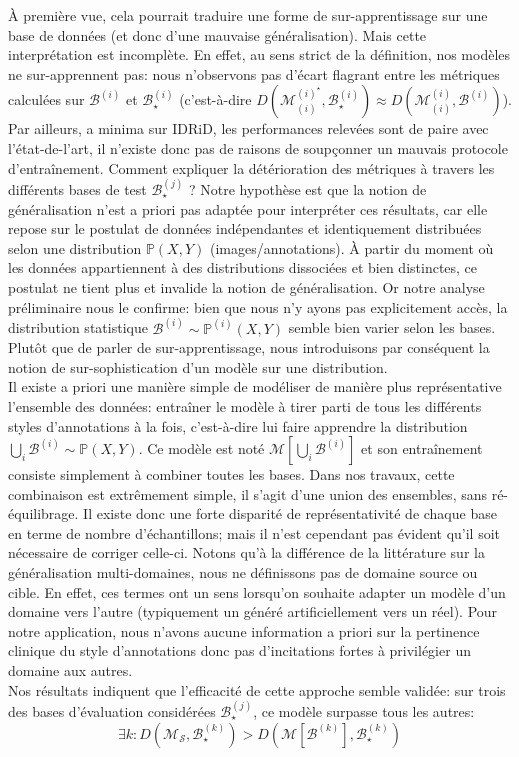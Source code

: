 À première vue, cela pourrait traduire une forme de sur-apprentissage sur une base de données (et donc d'une mauvaise généralisation). Mais cette interprétation est incomplète. En effet, au sens strict de la définition, nos modèles ne sur-apprennent pas: nous n'observons pas d'écart flagrant entre les métriques calculées sur $\mathcal{B}^{(i)}$ et $\mathcal{B}^{(i)}_{\star}$ (c'est-à-dire $D(\mathcal{M}_{(i)}^{(i)^\star},\mathcal{B}^{(i)}_{\star}) \approx D(\mathcal{M}_{(i)}^{(i)}, \mathcal{B}^{(i)})$). Par ailleurs, a minima sur IDRiD, les performances relevées sont de paire avec l'état-de-l'art, il n'existe donc pas de raisons de soupçonner un mauvais protocole d'entraînement. Comment expliquer la détérioration des métriques à travers les différents bases de test $\mathcal{B}^{(j)}_{\star}$ ? Notre hypothèse est que la notion de généralisation n'est a priori pas adaptée pour interpréter ces résultats, car elle repose sur le postulat de données indépendantes et identiquement distribuées selon une distribution $\mathbb{P}(X, Y)$ (images/annotations). À partir du moment où les données appartiennent à des distributions dissociées et bien distinctes, ce postulat ne tient plus et invalide la notion de généralisation. Or notre analyse préliminaire nous le confirme: bien que nous n'y ayons pas explicitement accès, la distribution statistique $\mathcal{B}^{(i)} \sim \mathbb{P}^{(i)}(X, Y)$ semble bien varier selon les bases. Plutôt que de parler de sur-apprentissage, nous introduisons par conséquent la notion de sur-sophistication d'un modèle sur une distribution. 
\\
Il existe a priori une manière simple de modéliser de manière plus représentative l'ensemble des données: entraîner le modèle à tirer parti de tous les différents styles d'annotations à la fois, c'est-à-dire lui faire apprendre la distribution $\bigcup_i \mathcal{B}^{(i)} \sim \mathbb{P}(X, Y)$. Ce modèle est noté $\mathcal{M}[\bigcup_i \mathcal{B}^{(i)}]$ et son entraînement consiste simplement à combiner toutes les bases. Dans nos travaux, cette combinaison est extrêmement simple, il s'agit d'une union des ensembles, sans ré-équilibrage. Il existe donc une forte disparité de représentativité de chaque base en terme de nombre d'échantillons; mais il n'est cependant pas évident qu'il soit nécessaire de corriger celle-ci. Notons qu'à la différence de la littérature sur la généralisation multi-domaines, nous ne définissons pas de domaine source ou cible. En effet, ces termes ont un sens lorsqu'on souhaite adapter un modèle d'un domaine vers l'autre (typiquement un généré artificiellement vers un réel). Pour notre application, nous n'avons aucune information a priori sur la pertinence clinique du style d'annotations donc pas d'incitations fortes à privilégier un domaine aux autres.
 \\
Nos résultats indiquent que l'efficacité de cette approche semble validée: sur trois des bases d'évaluation considérées $\mathcal{B}^{(j)}_{\star}$, ce modèle surpasse tous les autres:
\begin{equation}
	\label{eq:ParadoxalResults}
	 \exists k : D(\mathcal{M}_\mathcal{S}, \mathcal{B}^{(k)}_{\star}) > D(\mathcal{M}[\mathcal{B}^{(k)}], \mathcal{B}^{(k)}_{\star})
\end{equation}

